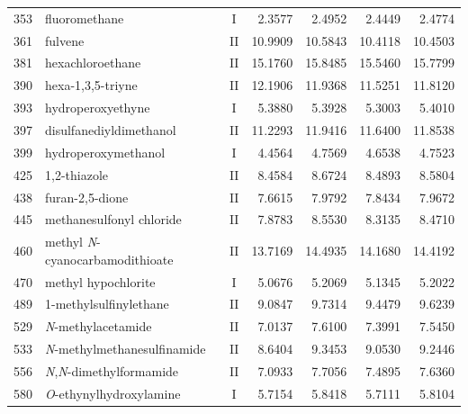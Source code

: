 \begin{longtable}{rlcd{2.5}d{2.5}d{2.5}d{2.5}}
    353  & fluoromethane                                          & I  & 2.3577  & 2.4952  & 2.4449  & 2.4774  \\
    361  & fulvene                                                & II & 10.9909 & 10.5843 & 10.4118 & 10.4503 \\
    381  & hexachloroethane                                       & II & 15.1760 & 15.8485 & 15.5460 & 15.7799 \\
    390  & hexa-1,3,5-triyne                                      & II & 12.1906 & 11.9368 & 11.5251 & 11.8120 \\
    393  & hydroperoxyethyne                                      & I  & 5.3880  & 5.3928  & 5.3003  & 5.4010  \\
    397  & disulfanediyldimethanol                                & II & 11.2293 & 11.9416 & 11.6400 & 11.8538 \\
    399  & hydroperoxymethanol                                    & I  & 4.4564  & 4.7569  & 4.6538  & 4.7523  \\
    425  & 1,2-thiazole                                           & II & 8.4584  & 8.6724  & 8.4893  & 8.5804  \\
    438  & furan-2,5-dione                                        & II & 7.6615  & 7.9792  & 7.8434  & 7.9672  \\
    445  & methanesulfonyl chloride                               & II & 7.8783  & 8.5530  & 8.3135  & 8.4710  \\
    460  & methyl \textit{N}-cyanocarbamodithioate                & II & 13.7169 & 14.4935 & 14.1680 & 14.4192 \\
    470  & methyl hypochlorite                                    & I  & 5.0676  & 5.2069  & 5.1345  & 5.2022  \\
    489  & 1-methylsulfinylethane                                 & II & 9.0847  & 9.7314  & 9.4479  & 9.6239  \\
    529  & \textit{N}-methylacetamide                             & II & 7.0137  & 7.6100  & 7.3991  & 7.5450  \\
    533  & \textit{N}-methylmethanesulfinamide                    & II & 8.6404  & 9.3453  & 9.0530  & 9.2446  \\
    556  & \textit{N},\textit{N}-dimethylformamide                & II & 7.0933  & 7.7056  & 7.4895  & 7.6360  \\
    580  & \textit{O}-ethynylhydroxylamine                        & I  & 5.7154  & 5.8418  & 5.7111  & 5.8104  \\

\end{longtable}
